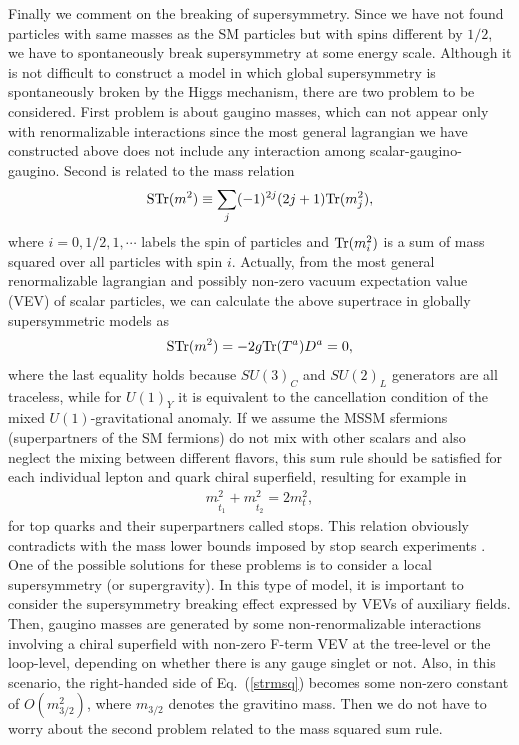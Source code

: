 \documentclass[12pt,twoside,book]{article}
\begin{document}
Finally we comment on the breaking of supersymmetry.  Since we have not
found particles with same masses as the SM particles but with spins
different by $1/2$, we have to spontaneously break supersymmetry at some
energy scale.  Although it is not difficult to construct a model in
which global supersymmetry is spontaneously broken by the Higgs
mechanism, there are two problem to be considered.  First problem is
about gaugino masses, which can not appear only with renormalizable
interactions since the most general lagrangian we have constructed above
does not include any interaction among scalar-gaugino-gaugino.  Second
is related to the mass relation
\begin{align}
 {\rm STr}(m^2) \equiv \sum_{j} (-1)^{2j} (2j+1) {\rm Tr} (m_j^2),
\end{align}
where $i=0,1/2,1,\cdots$ labels the spin of particles and ${\rm Tr}
(m_i^2)$ is a sum of mass squared over all particles with spin $i$.
Actually, from the most general renormalizable lagrangian and possibly
non-zero vacuum expectation value (VEV) of scalar particles, we can
calculate the above supertrace in globally supersymmetric models as
\begin{align}
 {\rm STr}(m^2) = -2g{\rm Tr}(T^a) D^a = 0,\label{strmsq}
\end{align}
where the last equality holds because $SU(3)_C$ and $SU(2)_L$ generators
are all traceless, while for $U(1)_Y$ it is equivalent to the
cancellation condition of the mixed $U(1)$-gravitational anomaly.  If we
assume the MSSM sfermions (superpartners of the SM fermions) do not mix
with other scalars and also neglect the mixing between different
flavors, this sum rule should be satisfied for each individual lepton
and quark chiral superfield, resulting for example in
\begin{align}
 m_{\tilde{t}_1}^2 + m_{\tilde{t}_2}^2 = 2 m_t^2,
\end{align}
for top quarks and their superpartners called stops.  This relation
obviously contradicts with the mass lower bounds imposed by stop search
experiments \cite{ATLAS:2016kts, CMS:2016mwj}.  One of the possible
solutions for these problems is to consider a local supersymmetry (or
supergravity).  In this type of model, it is important to consider the
supersymmetry breaking effect expressed by VEVs of auxiliary fields.
Then, gaugino masses are generated by some non-renormalizable
interactions involving a chiral superfield with non-zero F-term VEV at
the tree-level or the loop-level, depending on whether there is any
gauge singlet or not.  Also, in this scenario, the right-handed side of
Eq.\ (\ref{strmsq}) becomes some non-zero constant of $O(m_{3/2}^2)$,
where $m_{3/2}$ denotes the gravitino mass.  Then we do not have to
worry about the second problem related to the mass squared sum rule.
\end{document}

